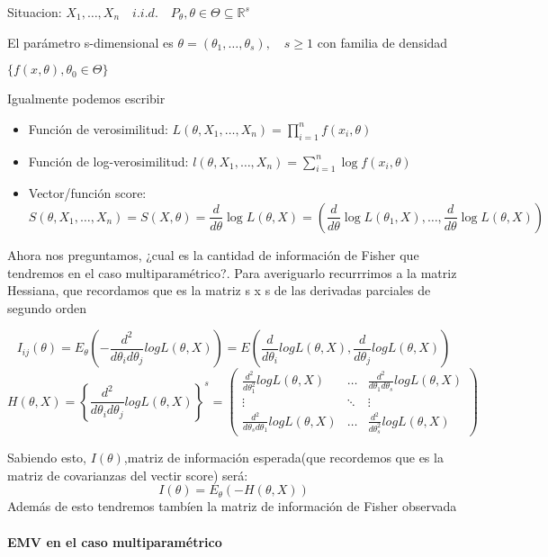 Situacion:
\(
X_1,\dots,X_n \quad i.i.d. \quad P_\theta,\theta \in \Theta \subseteq \mathbb{R}^s \)  

El parámetro s-dimensional es
\(
\theta = (\theta_1,\dots,\theta_s), \quad s \geq 1 \)
 con familia de densidad 

 \(
 \{ f(x,\theta),\theta_0 \in \Theta\}
\)

Igualmente podemos escribir

\begin{itemize}
    \item Función de verosimilitud: $L(\theta,X_1,\dots,X_n)=\prod^{n}_{i=1} f(x_i,\theta)$
    \item Función de log-verosimilitud: $l(\theta,X_1,\dots,X_n)=\sum^{n}_{i=1} \log f(x_i,\theta)$
    \item Vector/función score: $$S(\theta,X_1,\dots,X_n)=S(X,\theta)=\frac{d}{d \theta} \log L(\theta,X)
    = \left(\frac{d}{d \theta} \log L(\theta_1,X),\dots,\frac{d}{d \theta} \log L(\theta,X)\right)$$
\end{itemize}

Ahora nos preguntamos, ¿cual es la cantidad de información de Fisher que tendremos en el caso multiparamétrico?.
Para averiguarlo recurrrimos a la matriz Hessiana, que recordamos que es la matriz s x s de las derivadas parciales de segundo orden

\[
I_{ij}(\theta)=E_\theta\left(-\frac{d^2}{d \theta_i d \theta_j} log L(\theta,X)\right)
=E\left(\frac{d}{d \theta_i} log L(\theta,X),\frac{d}{d \theta_j} log L(\theta,X)\right)
\]
\[
H(\theta,X)=\left\{ \frac{d^2}{d \theta_i d \theta_j}log L(\theta,X) \right\}^s 
=
\begin{pmatrix}
    \frac{d^2}{d \theta_1^2}log L(\theta,X) & \dots & \frac{d^2}{d \theta_1 d \theta_s}log L(\theta,X) \\
    \vdots & \ddots & \vdots \\
    \frac{d^2}{d \theta_s d \theta_1}log L(\theta,X) & \dots & \frac{d^2}{d \theta_s^2}log L(\theta,X)
\end{pmatrix}
\]

Sabiendo esto, $I(\theta)$,matriz de información esperada(que recordemos que es la matriz de covarianzas del vectir score) será:
\[
I(\theta) = E_\theta(-H(\theta,X))
\]
Además de esto tendremos tambíen la matriz de información de Fisher observada

\paragraph{EMV en el caso multiparamétrico}

